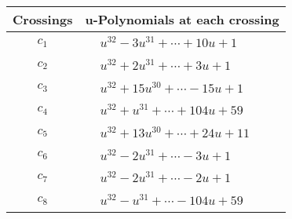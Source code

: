 \documentclass[1p]{elsarticle_modified}
\theoremstyle{definition}
\begin{document}
\begin{tabular}{m{50pt}|m{274pt}}
Crossings & \hspace{64pt}u-Polynomials at each crossing \\
\hline $$\begin{aligned}c_{1}\end{aligned}$$&$\begin{aligned}
&u^{32}-3 u^{31}+\cdots+10 u+1
\end{aligned}$\\
\hline $$\begin{aligned}c_{2}\end{aligned}$$&$\begin{aligned}
&u^{32}+2 u^{31}+\cdots+3 u+1
\end{aligned}$\\
\hline $$\begin{aligned}c_{3}\end{aligned}$$&$\begin{aligned}
&u^{32}+15 u^{30}+\cdots-15 u+1
\end{aligned}$\\
\hline $$\begin{aligned}c_{4}\end{aligned}$$&$\begin{aligned}
&u^{32}+u^{31}+\cdots+104 u+59
\end{aligned}$\\
\hline $$\begin{aligned}c_{5}\end{aligned}$$&$\begin{aligned}
&u^{32}+13 u^{30}+\cdots+24 u+11
\end{aligned}$\\
\hline $$\begin{aligned}c_{6}\end{aligned}$$&$\begin{aligned}
&u^{32}-2 u^{31}+\cdots-3 u+1
\end{aligned}$\\
\hline $$\begin{aligned}c_{7}\end{aligned}$$&$\begin{aligned}
&u^{32}-2 u^{31}+\cdots-2 u+1
\end{aligned}$\\
\hline $$\begin{aligned}c_{8}\end{aligned}$$&$\begin{aligned}
&u^{32}- u^{31}+\cdots-104 u+59
\end{aligned}$\\

\end{tabular}
\end{document}
